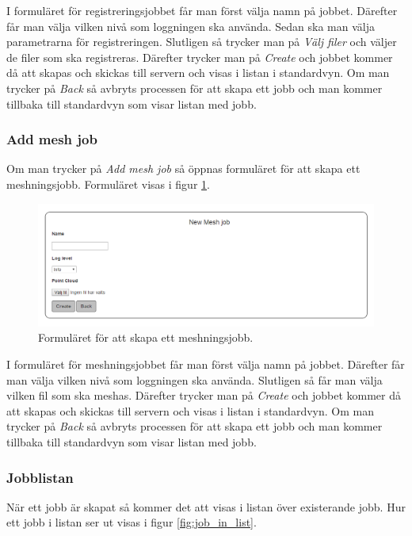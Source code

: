 \documentclass[a4paper,titlepage,12pt]{article}
\begin{document}
	I formuläret för registreringsjobbet får man först välja namn på jobbet. Därefter får man välja vilken nivå som loggningen ska använda. Sedan ska man välja parametrarna för registreringen. Slutligen så trycker man på \textit{Välj filer} och väljer de filer som ska registreras. Därefter trycker man på \textit{Create} och jobbet kommer då att skapas och skickas till servern och visas i listan i standardvyn. Om man trycker på \textit{Back} så avbryts processen för att skapa ett jobb och man kommer tillbaka till standardvyn som visar listan med jobb.
	
	\subsubsection{Add mesh job}
	
	Om man trycker på \textit{Add mesh job} så öppnas formuläret för att skapa ett meshningsjobb. Formuläret visas i figur \ref{fig:mesh_job_form}.
	
	\begin{figure}[H]
		\centering
		\includegraphics[width=160mm]{images/mesh_job_form.PNG}
		\caption{Formuläret för att skapa ett meshningsjobb.}
		\label{fig:mesh_job_form}
	\end{figure}

	I formuläret för meshningsjobbet får man först välja namn på jobbet. Därefter får man välja vilken nivå som loggningen ska använda. Slutligen så får man välja vilken fil som ska meshas. Därefter trycker man på \textit{Create} och jobbet kommer då att skapas och skickas till servern och visas i listan i standardvyn. Om man trycker på \textit{Back} så avbryts processen för att skapa ett jobb och man kommer tillbaka till standardvyn som visar listan med jobb.
	
	\subsubsection{Jobblistan}
	
	När ett jobb är skapat så kommer det att visas i listan över existerande jobb. Hur ett jobb i listan ser ut visas i figur \ref{fig:job_in_list}.
	
\end{document}
